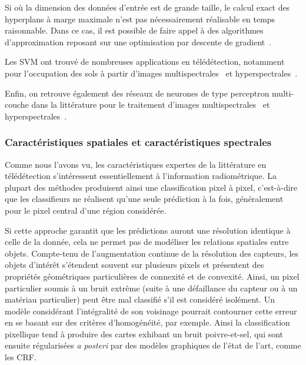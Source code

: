 Si où la dimension des données d'entrée est de grande taille, le calcul exact des hyperplans à marge maximale n'est pas nécessairement réalisable en temps raisonnable. Dans ce cas, il est possible de faire appel à des algorithmes d'approximation reposant sur une optimisation par descente de gradient~\cite{bottou_large-scale_2010}.

Les \gls{SVM} ont trouvé de nombreuses applications en télédétection, notamment pour l'occupation des sols à partir d'images multispectrales~\cite{pal_support_2005} et hyperspectrales~\cite{melgani_classification_2004}.

Enfin, on retrouve également des réseaux de neurones de type perceptron multi-couche dans la littérature pour le traitement d'images multispectrales~\cite{benediktsson_neural_1990} et hyperspectrales~\cite{goel_classification_2003}.

\subsubsection{Caractéristiques spatiales et caractéristiques spectrales}

Comme nous l'avons vu, les caractéristiques expertes de la littérature en télédétection s'intéressent essentiellement à l'information radiométrique. La plupart des méthodes produisent ainsi une classification pixel à pixel, c'est-à-dire que les classifieurs ne réalisent qu'une seule prédiction à la fois, généralement pour le pixel central d'une région considérée.

Si cette approche garantit que les prédictions auront une résolution identique à celle de la donnée, cela ne permet pas de modéliser les relations spatiales entre objets. Compte-tenu de l'augmentation continue de la résolution des capteurs, les objets d'intérêt s'étendent souvent sur plusieurs pixels et présentent des propriétés géométriques particulières de connexité et de convexité. Ainsi, un pixel particulier soumis à un bruit extrême (suite à une défaillance du capteur ou à un matériau particulier) peut être mal classifié s'il est considéré isolément. Un modèle considérant l'intégralité de son voisinage pourrait contourner cette erreur en se basant sur des critères d'homogénéité, par exemple. Ainsi la classification pixellique tend à produire des cartes exhibant un bruit poivre-et-sel, qui sont ensuite régularisées \emph{a posteri} par des modèles graphiques de l'état de l'art, comme les \gls{CRF}.

